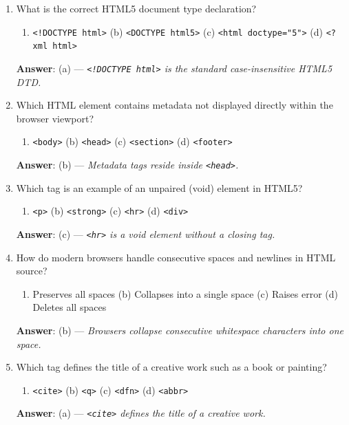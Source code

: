 \begin{enumerate}[leftmargin=1.5em]
    \item What is the correct HTML5 document type declaration?
    \begin{enumerate}[label=(\alph*)]
        \item \texttt{<!DOCTYPE html>} \quad (b) \texttt{<DOCTYPE html5>} \quad (c) \texttt{<html doctype="5">} \quad (d) \texttt{<?xml html>}
    \end{enumerate}
    \textbf{Answer}: (a) --- \textit{\texttt{<!DOCTYPE html>} is the standard case-insensitive HTML5 DTD.}

    \item Which HTML element contains metadata not displayed directly within the browser viewport?
    \begin{enumerate}[label=(\alph*)]
        \item \texttt{<body>} \quad (b) \texttt{<head>} \quad (c) \texttt{<section>} \quad (d) \texttt{<footer>}
    \end{enumerate}
    \textbf{Answer}: (b) --- \textit{Metadata tags reside inside \texttt{<head>}.}

    \item Which tag is an example of an unpaired (void) element in HTML5?
    \begin{enumerate}[label=(\alph*)]
        \item \texttt{<p>} \quad (b) \texttt{<strong>} \quad (c) \texttt{<hr>} \quad (d) \texttt{<div>}
    \end{enumerate}
    \textbf{Answer}: (c) --- \textit{\texttt{<hr>} is a void element without a closing tag.}

    \item How do modern browsers handle consecutive spaces and newlines in HTML source?
    \begin{enumerate}[label=(\alph*)]
        \item Preserves all spaces \quad (b) Collapses into a single space \quad (c) Raises error \quad (d) Deletes all spaces
    \end{enumerate}
    \textbf{Answer}: (b) --- \textit{Browsers collapse consecutive whitespace characters into one space.}

    \item Which tag defines the title of a creative work such as a book or painting?
    \begin{enumerate}[label=(\alph*)]
        \item \texttt{<cite>} \quad (b) \texttt{<q>} \quad (c) \texttt{<dfn>} \quad (d) \texttt{<abbr>}
    \end{enumerate}
    \textbf{Answer}: (a) --- \textit{\texttt{<cite>} defines the title of a creative work.}


\end{enumerate}

